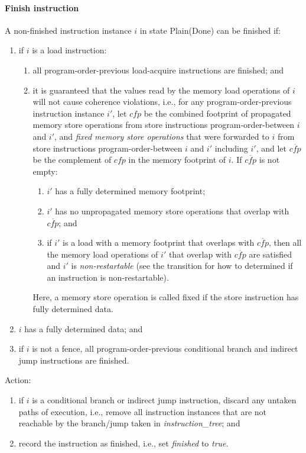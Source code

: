 \paragraph{Finish instruction}\label{omm:finish}
A non-finished instruction instance $i$ in state {\sc Plain}({\sc Done}) can be finished if:
\begin{enumerate}
\item if $i$ is a load instruction:
  \begin{enumerate}
  \item all program-order-previous load-acquire instructions are finished; and
  \item it is guaranteed that the values read by the memory load operations of $i$ will not cause coherence violations, i.e., for any program-order-previous instruction instance $i'$, let $\textit{cfp}$ be the combined footprint of propagated memory store operations from store instructions program-order-between $i$ and $i'$, and {\em fixed memory store operations} that were forwarded to $i$ from store instructions program-order-between $i$ and $i'$ including $i'$, and let $\overline{\textit{cfp}}$ be the complement of $\textit{cfp}$ in the memory footprint of $i$.
  If $\overline{\textit{cfp}}$ is not empty:
    \begin{enumerate}
    \item $i'$ has a fully determined memory footprint;
    \item $i'$ has no unpropagated memory store operations that overlap with $\overline{\textit{cfp}}$; and
    \item if $i'$ is a load with a memory footprint that overlaps with $\overline{\textit{cfp}}$, then all the memory load operations of $i'$ that overlap with $\overline{\textit{cfp}}$ are satisfied and $i'$ is {\em non-restartable} (see the  transition for how to determined if an instruction is non-restartable).
    \end{enumerate}
  Here, a memory store operation is called fixed if the store instruction has fully determined data.
  \end{enumerate}
\item $i$ has a fully determined data; and
\item if $i$ is not a fence, all program-order-previous conditional branch and indirect jump instructions are finished.
\end{enumerate}
Action:
\begin{enumerate}
\item if $i$ is a conditional branch or indirect jump instruction, discard any untaken paths of execution, i.e., remove all instruction instances that are not reachable by the branch/jump taken in {\it instruction\_tree}; and
\item record the instruction as finished, i.e., set {\it finished} to {\it true}.
\end{enumerate}


